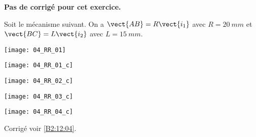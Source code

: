 \normaltrue
\correctiontrue


\setcounter{numques}{0}
\ifcorrection
\else
\textbf{Pas de corrigé pour cet exercice.}
\fi

\ifprof
\else
Soit le mécanisme suivant. On a $\vect{AB}=R\vect{i_1}$ avec $R=\SI{20}{mm}$ et  
$\vect{BC}=L\vect{i_2}$ avec $L=\SI{15}{mm}$.
\begin{center}
\texttt{[image: 04\_RR\_01]}
\end{center}
\fi

\ifprof
\begin{center}
\texttt{[image: 04\_RR\_01\_c]}
\end{center}
\else
\fi


\ifprof
\begin{multicols}{3}
\else
\fi

\ifprof
\begin{center}
\texttt{[image: 04\_RR\_02\_c]}
\end{center}
\else
\fi

\ifprof
\begin{center}
\texttt{[image: 04\_RR\_03\_c]}
\end{center}
\else
\fi


\ifprof
\begin{center}
\texttt{[image: 04\_RR\_04\_c]}
\end{center}
\else
\fi

\ifprof
\end{multicols}
\else
\fi

\ifprof
\else
\begin{flushright}
\footnotesize{Corrigé  voir \ref{B2:12:04}.}
\end{flushright}%
\fi